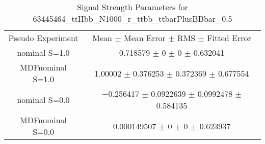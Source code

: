 \begin{table}
\centering
\caption{Signal Strength Parameters for 63445464\_ttHbb\_N1000\_r\_ttbb\_ttbarPlusBBbar\_0.5}
\begin{tabular}{cc}
\toprule
Pseudo Experiment & Mean $\pm$ Mean Error $\pm$ RMS $\pm$ Fitted Error\\
nominal S=1.0 & \num{0.718579} $\pm$ \num{0} $\pm$ \num{0} $\pm$ \num{0.632041}\\
MDFnominal S=1.0 & \num{1.00002} $\pm$ \num{0.376253} $\pm$ \num{0.372369} $\pm$ \num{0.677554}\\
nominal S=0.0 & \num{-0.256417} $\pm$ \num{0.0922639} $\pm$ \num{0.0992478} $\pm$ \num{0.584135}\\
MDFnominal S=0.0 & \num{0.000149507} $\pm$ \num{0} $\pm$ \num{0} $\pm$ \num{0.623937}\\
\bottomrule
\end{tabular}
\end{table}